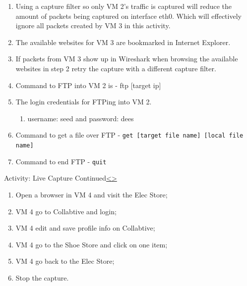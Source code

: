 \documentclass[12pt]{extarticle}
\newenvironment{instructionblock}{\Large\bgroup}{\egroup}
\newcommand{\ben}{\begin{enumerate}}
\newcommand{\een}{\end{enumerate}}
\begin{document}
	\begin{enumerate}
		\item Using a capture filter so only VM 2's traffic is captured will reduce the amount of packets being captured on interface eth0. Which will effectively ignore all packets created by VM 3 in this activity.
		
		\item The available websites for VM 3 are bookmarked in Internet Explorer.
		
		\item If packets from VM 3 show up in Wireshark when browsing the available websites in step 2 retry the capture with a different capture filter.
		
		\item Command to FTP into VM 2 is - ftp [target ip]
		
		\item The login credentials for FTPing into VM 2.
		\ben
			\item username: seed and password: dees
		\een
		
		\item Command to get a file over FTP - \texttt{get [target file name] [local file name]}
		
		\item Command to end FTP - \texttt{quit}
	\end{enumerate}
	
	
	
	
	\pagebreak
	\begin{slide}{Activity: Live Capture Continued}{\hyperref[slide 29]{\textless}\hyperref[slide 31]{\textgreater}}
		\begin{instructionblock}
			\begin{enumerate}
				\item Open a browser in VM 4 and visit the Elec Store;
				\item VM 4 go to Collabtive and login;
				\item VM 4 edit and save profile info on Collabtive;
				\item VM 4 go to the Shoe Store and click on one item;
				\item VM 4 go back to the Elec Store;
				\item Stop the capture.
			\end{enumerate}
		\end{instructionblock}
	\end{slide}
	
\end{document}
